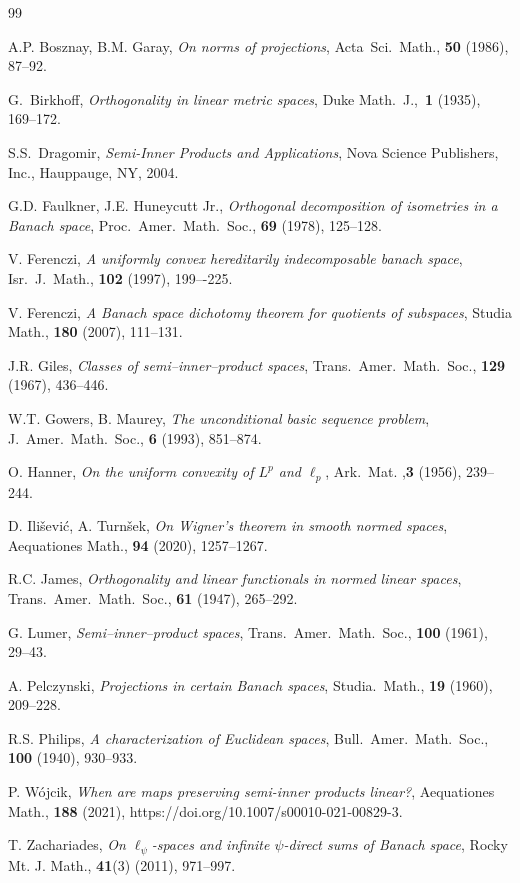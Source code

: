 \documentclass[12pt, reqno]{amsart}
\theoremstyle{definition}
\theoremstyle{remark}
\numberwithin{equation}{section}
\begin{document}

\begin{thebibliography}{99}

 A.P. Bosznay, B.M. Garay, \emph{On norms of projections}, Acta\ Sci.\ Math.\/, \textbf{50} (1986), 87--92.

G.\ Birkhoff, \emph{Orthogonality in linear metric spaces}, Duke
Math.\ J.\/,~\textbf{1} (1935), 169--172.

S.S.\ Dragomir, \emph{Semi-Inner Products and Applications}, Nova
Science Publishers, Inc., Hauppauge, NY, 2004.

G.D. Faulkner, J.E. Huneycutt Jr., \emph{Orthogonal decomposition of isometries in a Banach space}, Proc.\ Amer.\ Math.\ Soc.\/, \textbf{69} (1978), 125--128.

V. Ferenczi, \emph{A uniformly convex hereditarily indecomposable banach space}, Isr.\ J.\ Math.\/, \textbf{102} (1997), 199–-225.

V. Ferenczi, \emph{A Banach space dichotomy theorem for quotients of subspaces}, Studia Math., \textbf{180} (2007), 111--131.

J.R. Giles, \emph{Classes of semi--inner--product spaces}, Trans.\
Amer.\ Math.\ Soc.\/, \textbf{129} (1967), 436--446.

W.T. Gowers, B. Maurey, \emph{The unconditional basic sequence
problem}, J.\ Amer.\ Math.\ Soc., \textbf{6} (1993), 851--874. 

O. Hanner, \emph{On the uniform convexity of $L^p$ and $\ell_p$}, Ark.\ Mat.\/ ,\textbf{3} (1956), 239--244.

D. Ili\v{s}evi\'{c}, A. Turn\v{s}ek, \emph{On Wigner’s theorem in smooth normed spaces}, Aequationes Math., \textbf{94} (2020), 1257--1267.

R.C. James, \emph{Orthogonality and linear functionals in normed
linear spaces}, Trans.\ Amer.\ Math.\ Soc.\/, \textbf{61} (1947), 265--292.

G. Lumer, \emph{Semi--inner--product spaces}, Trans.\ Amer.\
Math.\ Soc.\/, \textbf{100} (1961), 29--43.

A. Pelczynski, \emph{Projections in certain Banach spaces}, Studia.\ Math., \textbf{19} (1960), 209--228.

\bibitem{philips}
R.S. Philips, \emph{A characterization of Euclidean spaces}, Bull.\ Amer.\ Math.\ Soc.\/, \textbf{100} (1940), 930--933.

\bibitem{wojcik}
P. W\'ojcik, \emph{When are maps preserving semi-inner products linear?}, Aequationes Math., \textbf{188} (2021), https://doi.org/10.1007/s00010-021-00829-3.

\bibitem{zachariades}
T. Zachariades, \textit{On $\ell_{\psi}$-spaces and infinite $\psi$-direct sums of Banach space},
Rocky Mt. J. Math., \textbf{41}(3) (2011), 971--997.
\end{thebibliography}
\end{document}
